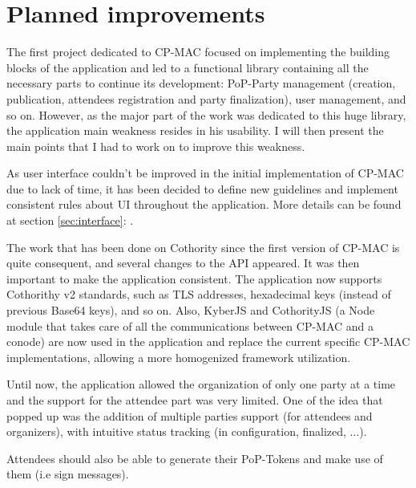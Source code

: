 \section{Planned improvements}
The first project dedicated to CP-MAC focused on implementing the building blocks of the application and led to a functional library containing all the necessary parts to continue its development:  PoP-Party management (crea\-tion, publication, attendees registration and party finalization), user mana\-gement, and so on. However, as the major part of the work was dedicated to this huge library, the application main weakness resides in his usability. I will then present the main points that I had to work on to improve this weakness.

\begin{description}[style=nextline]
	\item[Interface]  As user interface couldn't be improved in the initial implementation of CP-MAC due to lack of time, it has been decided to define new guidelines and implement consistent rules about UI throughout the application. More details can be found at section \ref{sec:interface}: .
	\item[Cothority v2] The work that has been done on Cothority since the first version of CP-MAC is quite consequent, and several changes to the API appeared. It was then important to make the application consistent. The application now supports Cothorithy v2 standards, such as TLS addresses, hexa\-decimal keys (instead of previous Base64 keys), and so on. Also, KyberJS and CothorityJS (a Node module that takes care of all the communications between CP-MAC and a conode) are now used in the application and replace the current specific CP-MAC implementations, allowing a more homogenized framework utilization. 
	\item[Proof-Of-Persoonhood enhancements] Until now, the application allowed the organization of only one party at a time and the support for the attendee part was very limited. One of the idea that popped up was the addition of multiple parties support (for attendees and organizers), with intuitive status tracking (in configuration, finalized, ...). 
	
	Attendees should also be able to generate their PoP-Tokens and make use of them (i.e sign messages). 
	

\end{description}
